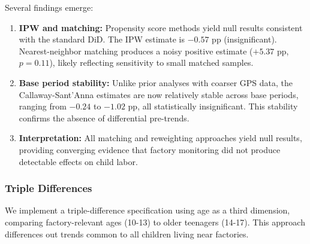 \documentclass[12pt]{article}
\begin{document}
Several findings emerge:
\begin{enumerate}
\item \textbf{IPW and matching:} Propensity score methods yield null results consistent with the standard DiD. The IPW estimate is $-0.57$ pp (insignificant). Nearest-neighbor matching produces a noisy positive estimate ($+5.37$ pp, $p = 0.11$), likely reflecting sensitivity to small matched samples.

\item \textbf{Base period stability:} Unlike prior analyses with coarser GPS data, the Callaway-Sant'Anna estimates are now relatively stable across base periods, ranging from $-0.24$ to $-1.02$ pp, all statistically insignificant. This stability confirms the absence of differential pre-trends.

\item \textbf{Interpretation:} All matching and reweighting approaches yield null results, providing converging evidence that factory monitoring did not produce detectable effects on child labor.
\end{enumerate}

\subsubsection{Triple Differences}

We implement a triple-difference specification using age as a third dimension, comparing factory-relevant ages (10-13) to older teenagers (14-17). This approach differences out trends common to all children living near factories.
\end{document}
